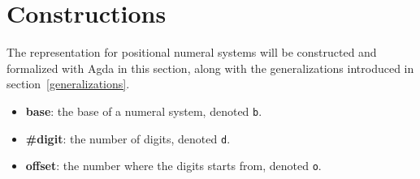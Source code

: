 \documentclass[\main/thesis.tex]{subfiles}
\begin{document}
\chapter{Constructions}\label{constructions}

The representation for positional numeral systems will be constructed and
formalized with Agda in this section,
along with the generalizations introduced in section~\ref{generalizations}.

\begin{itemize}
    \item \textbf{base}: the base of a numeral system, denoted {\lstinline|b|}.
    \item \textbf{\#digit}: the number of digits, denoted {\lstinline|d|}.
    \item \textbf{offset}: the number where the digits starts from, denoted {\lstinline|o|}.
\end{itemize}













%
%
%
\end{document}
